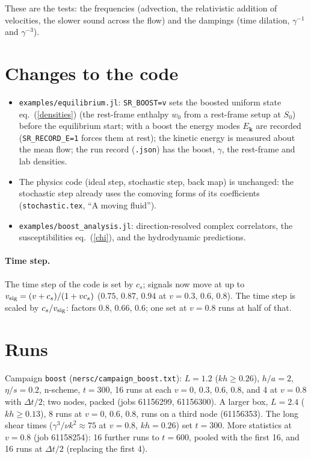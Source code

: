 \documentclass[11pt,aps,preprint,nofootinbib,superscriptaddress,tightenlines]{revtex4-2}
\def\Eq#1{eq.~(\ref{#1})}
\let\oldparagraph\paragraph
\renewcommand{\paragraph}{\par\bigskip\oldparagraph}
\begin{document}
These are the tests: the frequencies (advection, the relativistic addition of velocities, the
slower sound across the flow) and the dampings (time dilation, $\gamma^{-1}$ and $\gamma^{-3}$).

\section{Changes to the code}
\label{sec:code}

\begin{itemize}
\item \texttt{examples/equilibrium.jl}: \texttt{SR\_BOOST=v} sets the boosted uniform state
  \Eq{densities} (the rest-frame enthalpy $w_0$ from a rest-frame setup at $S_0$) before the
  equilibrium start; with a boost the energy modes $E_{\bm k}$ are recorded (\texttt{SR\_RECORD\_E=1}
  forces them at rest); the kinetic energy is measured about the mean flow; the run record
  (\texttt{.json}) has the boost, $\gamma$, the rest-frame and lab densities.
\item The physics code (ideal step, stochastic step, back map) is unchanged: the stochastic
  step already uses the comoving forms of its coefficients (\texttt{stochastic.tex}, ``A moving
  fluid'').
\item \texttt{examples/boost\_analysis.jl}: direction-resolved complex correlators, the
  susceptibilities \Eq{chi}, and the hydrodynamic predictions.
\end{itemize}

\paragraph{Time step.}  The time step of the code is set by $c_s$; signals now move at up to
$v_{\rm sig}=(v+c_s)/(1+vc_s)$ ($0.75$, $0.87$, $0.94$ at $v=0.3$, $0.6$, $0.8$).  The time step is
scaled by $c_s/v_{\rm sig}$: factors $0.8$, $0.66$, $0.6$; one set at $v=0.8$ runs at half of that.

\section{Runs}
\label{sec:runs}

Campaign \texttt{boost} (\texttt{nersc/campaign\_boost.txt}): $L=1.2$ ($kh\ge0.26$), $h/a=2$, $\eta/s=0.2$,
n-scheme, $t=300$, 16 runs at each $v=0$, $0.3$, $0.6$, $0.8$, and 4 at $v=0.8$ with $\Delta t/2$; two
nodes, packed (jobs 61156299, 61156300).  A larger box, $L=2.4$ ($kh\ge0.13$), 8 runs at $v=0$, $0.6$, $0.8$,
runs on a third node (61156353).  The long shear times ($\gamma^3/\nu k^2\approx75$ at $v=0.8$, $kh=0.26$) set $t=300$. 
More statistics at $v=0.8$ (job 61158254): 16 further runs to $t=600$, pooled with the first 16, and 16
runs at $\Delta t/2$ (replacing the first 4).
\end{document}
